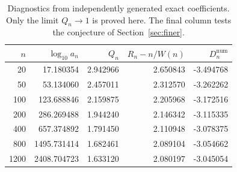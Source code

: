 \begin{table}[htbp]
\centering\small
\begin{tabular}{rrrrr}\toprule
$n$ & $\log_{10}a_n$ & $Q_n$ & $R_n-n/W(n)$ & $D_n^{\mathrm{num}}$ \\
\midrule
20 & 17.180354 & 2.942966 & 2.650843 & -3.494768 \\
50 & 53.134060 & 2.457011 & 2.312570 & -3.262262 \\
100 & 123.688846 & 2.159875 & 2.205968 & -3.172516 \\
200 & 286.269488 & 1.944240 & 2.146342 & -3.115335 \\
400 & 657.374892 & 1.791450 & 2.110948 & -3.078375 \\
800 & 1495.731414 & 1.682461 & 2.089104 & -3.054662 \\
1200 & 2408.704723 & 1.633120 & 2.080197 & -3.045054 \\
\bottomrule\end{tabular}
\caption{Diagnostics from independently generated exact coefficients. Only the limit $Q_n\to1$ is proved here. The final column tests the conjecture of Section~\ref{sec:finer}.}
\label{tab:diagnostics}\end{table}
